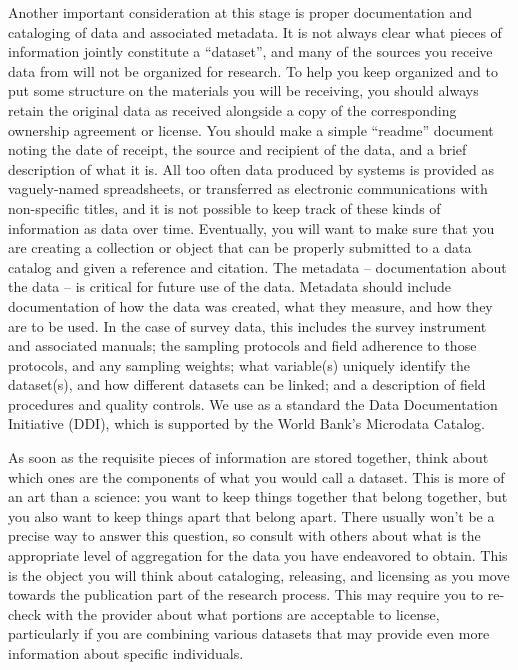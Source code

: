 Another important consideration at this stage is 
proper documentation and cataloging of data and associated metadata.
It is not always clear what pieces of information jointly constitute a ``dataset'',
and many of the sources you receive data from will not be organized for research.
To help you keep organized and to put some structure on the materials you will be receiving,
you should always retain the original data as received
alongside a copy of the corresponding ownership agreement or license.
You should make a simple ``readme'' document noting the date of receipt,
the source and recipient of the data, and a brief description of what it is.
All too often data produced by systems is provided as vaguely-named spreadsheets,
or transferred as electronic communications with non-specific titles,
and it is not possible to keep track of these kinds of information as data over time.
Eventually, you will want to make sure that you are creating a collection or object
that can be properly submitted to a data catalog and given a reference and citation.
The metadata -- documentation about the data -- is critical for future use of the data.
Metadata should include documentation of how the data was created, 
what they measure, and how they are to be used.
In the case of survey data, this includes the survey instrument and associated manuals; 
the sampling protocols and field adherence to those protocols, and any sampling weights;
what variable(s) uniquely identify the dataset(s), and how different datasets can be linked;
and a description of field procedures and quality controls. 
We use as a standard the Data Documentation Initiative (DDI), which is supported by the 
World Bank's Microdata Catalog.

As soon as the requisite pieces of information are stored together,
think about which ones are the components of what you would call a dataset.
This is more of an art than a science:
you want to keep things together that belong together,
but you also want to keep things apart that belong apart.
There usually won't be a precise way to answer this question,
so consult with others about what is the appropriate level of aggregation
for the data you have endeavored to obtain.
This is the object you will think about cataloging, releasing, and licensing
as you move towards the publication part of the research process.
This may require you to re-check with the provider
about what portions are acceptable to license,
particularly if you are combining various datasets
that may provide even more information about specific individuals.

